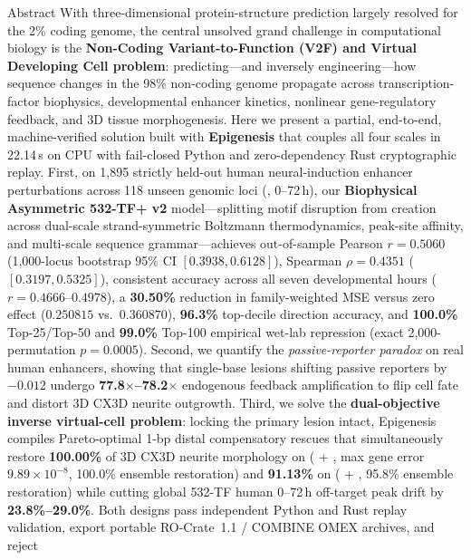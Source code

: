 \documentclass[10.5pt,a4paper]{article}
\begin{document}

\begin{abstractbox}{Abstract}
With three-dimensional protein-structure prediction largely resolved for the 2\% coding genome, the central unsolved grand challenge in computational biology is the \textbf{Non-Coding Variant-to-Function (V2F) and Virtual Developing Cell problem}: predicting—and inversely engineering—how sequence changes in the 98\% non-coding genome propagate across transcription-factor biophysics, developmental enhancer kinetics, nonlinear gene-regulatory feedback, and 3D tissue morphogenesis. Here we present a partial, end-to-end, machine-verified solution built with \textbf{Epigenesis} that couples all four scales in 22.14\,s on CPU with fail-closed Python and zero-dependency Rust cryptographic replay. First, on 1,895 strictly held-out human neural-induction enhancer perturbations across 118 unseen genomic loci (, 0--72\,h), our \textbf{Biophysical Asymmetric 532-TF+ v2} model—splitting motif disruption from creation across dual-scale strand-symmetric Boltzmann thermodynamics, peak-site affinity, and multi-scale sequence grammar—achieves out-of-sample Pearson \textbf{$r=0.5060$} (1,000-locus bootstrap 95\% CI $[0.3938, 0.6128]$), Spearman $\rho=0.4351$ ($[0.3197, 0.5325]$), consistent accuracy across all seven developmental hours ($r=0.4666$--$0.4978$), a \textbf{30.50\%} reduction in family-weighted MSE versus zero effect ($0.250815$ vs.\ $0.360870$), \textbf{96.3\%} top-decile direction accuracy, and \textbf{100.0\%} Top-25/Top-50 and \textbf{99.0\%} Top-100 empirical wet-lab repression (exact 2,000-permutation $p=0.0005$). Second, we quantify the \emph{passive-reporter paradox} on real human enhancers, showing that single-base lesions shifting passive reporters by $-0.012$ undergo \textbf{77.8$\times$--78.2$\times$} endogenous feedback amplification to flip cell fate and distort 3D CX3D neurite outgrowth. Third, we solve the \textbf{dual-objective inverse virtual-cell problem}: locking the primary lesion intact, Epigenesis compiles Pareto-optimal 1-bp distal compensatory rescues that simultaneously restore \textbf{100.00\%} of 3D CX3D neurite morphology on  ( + , max gene error $9.89\times10^{-8}$, 100.0\% ensemble restoration) and \textbf{91.13\%} on  ( + , 95.8\% ensemble restoration) while cutting global 532-TF human 0--72\,h off-target peak drift by \textbf{23.8\%--29.0\%}. Both designs pass independent Python and Rust replay validation, export portable RO-Crate~1.1 / COMBINE OMEX archives, and reject 
\end{abstractbox}
\end{document}
